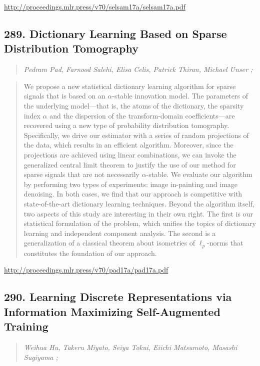 \documentclass{article}
\begin{document}
\href{http://proceedings.mlr.press/v70/selsam17a/selsam17a.pdf}{http://proceedings.mlr.press/v70/selsam17a/selsam17a.pdf}

\subsection{289. Dictionary Learning Based on Sparse Distribution Tomography}

\begin{quote}
\footnotesize{\textit{Pedram Pad, Farnood Salehi, Elisa Celis, Patrick Thiran, Michael Unser ;}}
\end{quote}

\begin{quote}
    We propose a new statistical dictionary learning algorithm for sparse signals that is based on an $\alpha$-stable innovation model. The parameters of the underlying model—that is, the atoms of the dictionary, the sparsity index $\alpha$ and the dispersion of the transform-domain coefficients—are recovered using a new type of probability distribution tomography. Specifically, we drive our estimator with a series of random projections of the data, which results in an efficient algorithm. Moreover, since the projections are achieved using linear combinations, we can invoke the generalized central limit theorem to justify the use of our method for sparse signals that are not necessarily $\alpha$-stable. We evaluate our algorithm by performing two types of experiments: image in-painting and image denoising. In both cases, we find that our approach is competitive with state-of-the-art dictionary learning techniques. Beyond the algorithm itself, two aspects of this study are interesting in their own right. The first is our statistical formulation of the problem, which unifies the topics of dictionary learning and independent component analysis. The second is a generalization of a classical theorem about isometries of $\ell_p$-norms that constitutes the foundation of our approach.  \end{quote}

\href{http://proceedings.mlr.press/v70/pad17a/pad17a.pdf}{http://proceedings.mlr.press/v70/pad17a/pad17a.pdf}

\subsection{290. Learning Discrete Representations via Information Maximizing Self-Augmented Training}

\begin{quote}
\footnotesize{\textit{Weihua Hu, Takeru Miyato, Seiya Tokui, Eiichi Matsumoto, Masashi Sugiyama ;}}
\end{quote}
\end{document}
